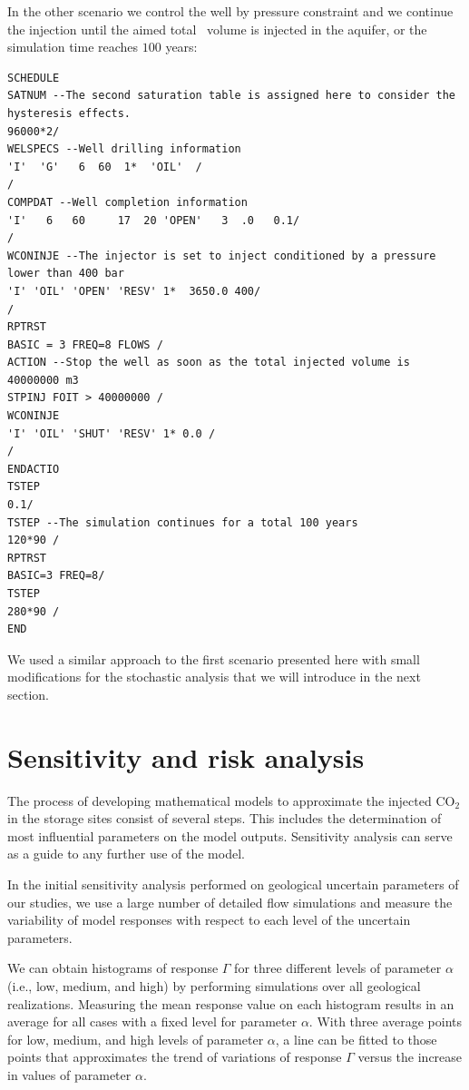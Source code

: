 In the other scenario we control the well by pressure constraint and we continue the injection until the aimed total \coo\ volume is injected in the aquifer, or the simulation time reaches $100$ years:
\begin{lstlisting}
SCHEDULE
SATNUM --The second saturation table is assigned here to consider the hysteresis effects.
96000*2/  
WELSPECS --Well drilling information
'I'  'G'   6  60  1*  'OIL'  /
/
COMPDAT --Well completion information
'I'   6   60     17  20 'OPEN'   3  .0   0.1/
/
WCONINJE --The injector is set to inject conditioned by a pressure lower than 400 bar
'I' 'OIL' 'OPEN' 'RESV' 1*  3650.0 400/
/
RPTRST
BASIC = 3 FREQ=8 FLOWS /
ACTION --Stop the well as soon as the total injected volume is 40000000 m3
STPINJ FOIT > 40000000 /
WCONINJE
'I' 'OIL' 'SHUT' 'RESV' 1* 0.0 /
/
ENDACTIO
TSTEP
0.1/
TSTEP --The simulation continues for a total 100 years
120*90 /
RPTRST
BASIC=3 FREQ=8/
TSTEP
280*90 /
END
\end{lstlisting}
We used a similar approach to the first scenario presented here with small modifications for the stochastic analysis that we will introduce in the next section.

\section{Sensitivity and risk analysis}
\label{sec:StochasticAnalysis}

The process of developing mathematical models to approximate the injected $\mbox{CO}_{2}$ in the
storage sites consist of several steps. This includes the determination of
most influential parameters on the model outputs. Sensitivity
analysis can serve as a guide to any further use of the model.

In the initial sensitivity analysis performed on geological uncertain
parameters of our studies, we use a large number of detailed flow
simulations and measure the variability of model responses with respect to each
level of the uncertain parameters.

We can obtain histograms of response $\Gamma$  for three different levels of
parameter $\alpha$ (i.e., low, medium, and high) by performing simulations over
all geological realizations. Measuring the mean response value on
each histogram results in an average for all cases with a fixed level for
parameter $\alpha$. With three average points for low, medium,
and high levels of parameter $\alpha$, a line can be fitted to those points 
that approximates the trend of variations of response $\Gamma$ versus the
increase in values of parameter $\alpha$.

